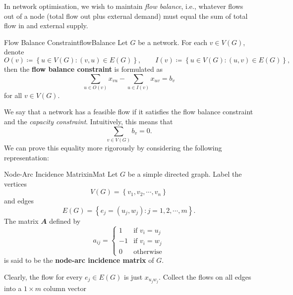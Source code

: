 \documentclass[math, code]{amznotes}
\theoremstyle{remark}
\begin{document}
In network optimisation, we wish to maintain \textit{flow balance}, i.e., whatever flows out of a node (total flow out plus external demand) must equal the sum of total flow in and external supply.
\begin{dfnbox}{Flow Balance Constraint}{flowBalance}
    Let $G$ be a network. For each $v \in V(G)$, denote 
    \begin{equation*}
        O(v) \coloneqq \left\{u \in V(G) \colon (v, u) \in E(G)\right\}, \qquad I(v) \coloneqq \left\{u \in V(G) \colon (u, v) \in E(G)\right\},
    \end{equation*}
    then the {\color{red} \textbf{flow balance constraint}} is formulated as 
    \begin{equation*}
        \sum_{u \in O(v)}x_{vu} - \sum_{u \in I(v)}x_{uv} = b_v
    \end{equation*}
    for all $v \in V(G)$.
\end{dfnbox}
We say that a network has a feasible flow if it satisfies the flow balance constraint and the \textit{capacity constraint}. Intuitively, this means that 
\begin{equation*}
    \sum_{v \in V(G)}b_v = 0.
\end{equation*}
We can prove this equality more rigorously by considering the following representation:
\begin{dfnbox}{Node-Arc Incidence Matrix}{inMat}
    Let $G$ be a simple directed graph. Label the vertices 
    \begin{equation*}
        V(G) = \left\{v_1, v_2, \cdots, v_n\right\}
    \end{equation*}
    and edges 
    \begin{equation*}
        E(G) = \left\{e_j = (u_j, w_j) \colon j = 1, 2, \cdots, m\right\}.
    \end{equation*}
    The matrix $\mathbfit{A}$ defined by 
    \begin{equation*}
        a_{ij} = \begin{cases}
            1 & \textrm{if } v_i = u_j \\
            -1 & \textrm{if } v_i = w_j \\
            0 & \textrm{otherwise}
        \end{cases}
    \end{equation*}
    is said to be the {\color{red} \textbf{node-arc incidence matrix}} of $G$.
\end{dfnbox}
Clearly, the flow for every $e_j \in E(G)$ is just $x_{u_jw_j}$. Collect the flows on all edges into a $1 \times m$ column vector 
\end{document}
